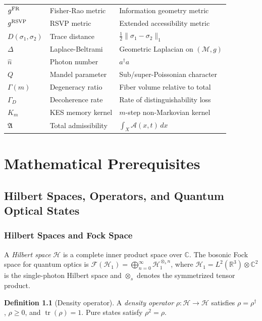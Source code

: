 \documentclass[11pt, openright, twoside]{book}
\theoremstyle{plain}
\theoremstyle{definition}
\newtheorem{definition}[theorem]{Definition}
\theoremstyle{remark}
\newcommand{\Admiss}{\mathcal{A}}
\newcommand{\Traj}{X}
\begin{document}
\begin{longtable}{@{}lll@{}}
$g^{\rm FR}$ & Fisher-Rao metric & Information geometry metric \\
$g^{\rm RSVP}$ & RSVP metric & Extended accessibility metric \\
$D(\sigma_1,\sigma_2)$ & Trace distance & $\frac{1}{2}\|\sigma_1-\sigma_2\|_1$ \\
$\Delta$ & Laplace-Beltrami & Geometric Laplacian on $(\mathcal{M},g)$ \\
$\hat{n}$ & Photon number & $a^\dagger a$ \\
$Q$ & Mandel parameter & Sub/super-Poissonian character \\
$\Gamma(m)$ & Degeneracy ratio & Fiber volume relative to total \\
$\Gamma_D$ & Decoherence rate & Rate of distinguishability loss \\
$K_m$ & KES memory kernel & $m$-step non-Markovian kernel \\
$\mathfrak{A}$ & Total admissibility & $\int_\Traj\Admiss(x,t)\,dx$ \\
\bottomrule
\end{longtable}

\tableofcontents
\mainmatter

\part{Mathematical Prerequisites}

\chapter{Hilbert Spaces, Operators, and Quantum Optical States}

\section{Hilbert Spaces and Fock Space}

A \emph{Hilbert space} $\mathcal{H}$ is a complete inner product space over $\mathbb{C}$.
The bosonic Fock space for quantum optics is
$\mathcal{F}(\mathcal{H}_1) = \bigoplus_{n=0}^\infty \mathcal{H}_1^{\otimes_s n}$,
where $\mathcal{H}_1 = L^2(\mathbb{R}^3)\otimes\mathbb{C}^2$ is the single-photon Hilbert
space and $\otimes_s$ denotes the symmetrized tensor product.

\begin{definition}[Density operator]
A \emph{density operator} $\rho:\mathcal{H}\to\mathcal{H}$ satisfies $\rho=\rho^\dagger$,
$\rho\geq 0$, and $\operatorname{tr}(\rho)=1$. Pure states satisfy $\rho^2=\rho$.
\end{definition}
\end{document}
